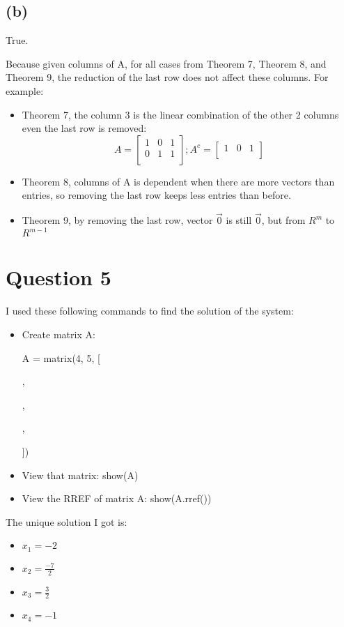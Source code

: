 \documentclass[10pt]{article}
\begin{document}
\subsection*{(b)}

\noindent True.
\par
\noindent Because given columns of A, for all cases from Theorem 7, Theorem 8, and Theorem 9, the reduction of the last row does not affect these columns. For example:
\begin{itemize}
    \item Theorem 7, the column 3 is the linear combination of the other 2 columns even the last row is removed:
    \begin{equation*}
        A=
        \begin{bmatrix}
            1 & 0 & 1 \\
            0 & 1 & 1 \\
        \end{bmatrix};
        A^c=
        \begin{bmatrix}
            1 & 0 & 1 \\
        \end{bmatrix}
    \end{equation*}
    \item Theorem 8, columns of A is dependent when there are more vectors than entries, so removing the last row keeps less entries than before.
    \item Theorem 9, by removing the last row, vector $\Vec{0}$ is still $\Vec{0}$, but from $R^m$ to $R^{m-1}$
\end{itemize}


\section*{Question 5}
\noindent I used these following commands to find the solution of the system:
\begin{itemize}
    \item Create matrix A:
    \par
    A = matrix(4, 5, [\par
[-2, 1, -1, 0, -1],\par
[3, -2, 2, 4, 0],\par
[-3, 1, 1, 7, -3],\par
[2, 0, 4, 1, 1]])
    \item View that matrix: show(A)
    \item View the RREF of matrix A: show(A.rref())
\end{itemize}

\noindent The unique solution I got is:
\begin{itemize}
    \item $x_1 = -2$
    \item $x_2 = \frac{-7}{2}$
    \item $x_3 = \frac{3}{2}$
    \item $x_4 = -1$
\end{itemize}
\end{document}
